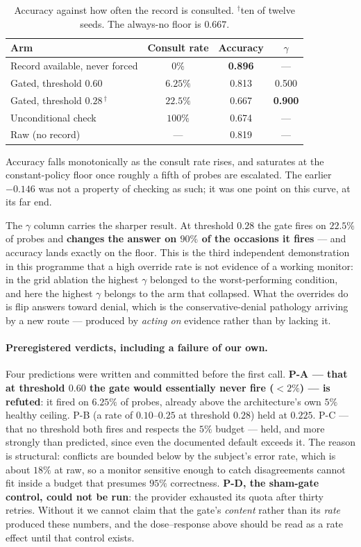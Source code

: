 \documentclass[11pt]{article}
\begin{document}
\begin{table}[h]
\centering
\begin{tabular}{lccc}
\toprule
Arm & Consult rate & Accuracy & $\gamma$ \\
\midrule
Record available, never forced & $0\%$      & \textbf{0.896} & --- \\
Gated, threshold $0.60$        & $6.25\%$   & 0.813 & 0.500 \\
Gated, threshold $0.28$\,$^\dagger$ & $22.5\%$ & 0.667 & \textbf{0.900} \\
Unconditional check            & $100\%$    & 0.674 & --- \\
\midrule
Raw (no record) & --- & 0.819 & --- \\
\bottomrule
\end{tabular}
\caption{Accuracy against how often the record is consulted. $^\dagger$ten of
twelve seeds. The always-no floor is $0.667$.}
\label{tab:dose}
\end{table}

Accuracy falls monotonically as the consult rate rises, and saturates at the
constant-policy floor once roughly a fifth of probes are escalated. The earlier
$-0.146$ was not a property of checking as such; it was one point on this
curve, at its far end.

The $\gamma$ column carries the sharper result. At threshold $0.28$ the gate
fires on $22.5\%$ of probes and \textbf{changes the answer on $90\%$ of the
occasions it fires} --- and accuracy lands exactly on the floor. This is the
third independent demonstration in this programme that a high override rate is
not evidence of a working monitor: in the grid ablation the highest $\gamma$
belonged to the worst-performing condition, and here the highest $\gamma$
belongs to the arm that collapsed. What the overrides do is flip answers toward
denial, which is the conservative-denial pathology arriving by a new route ---
produced by \emph{acting on} evidence rather than by lacking it.

\paragraph{Preregistered verdicts, including a failure of our own.} Four
predictions were written and committed before the first call. \textbf{P-A ---
that at threshold $0.60$ the gate would essentially never fire ($<2\%$) --- is
refuted}: it fired on $6.25\%$ of probes, already above the architecture's
own $5\%$ healthy ceiling. P-B (a rate of $0.10$--$0.25$ at threshold $0.28$)
held at $0.225$. P-C --- that no threshold both fires and respects the $5\%$
budget --- held, and more strongly than predicted, since even the documented
default exceeds it. The reason is structural: conflicts are bounded below by
the subject's error rate, which is about $18\%$ at raw, so a monitor sensitive
enough to catch disagreements cannot fit inside a budget that presumes $95\%$
correctness. \textbf{P-D, the sham-gate control, could not be run}: the
provider exhausted its quota after thirty retries. Without it we cannot claim
that the gate's \emph{content} rather than its \emph{rate} produced these
numbers, and the dose--response above should be read as a rate effect until
that control exists.
\end{document}
